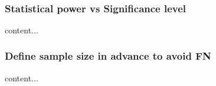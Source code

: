 \documentclass{beamer}
\begin{document}
\begin{frame}
\begin{columns}
\begin{column}{0.33\textwidth}
		\end{column}
		\begin{column}{0.33\textwidth}
			\\
		\end{column}
	\end{columns}
	
\end{frame}

\begin{frame}\frametitle{Statistical power vs Significance level}
content...
\end{frame}

\begin{frame}\frametitle{Define sample size in advance to avoid FN}
	content...
\end{frame}
\end{document}
